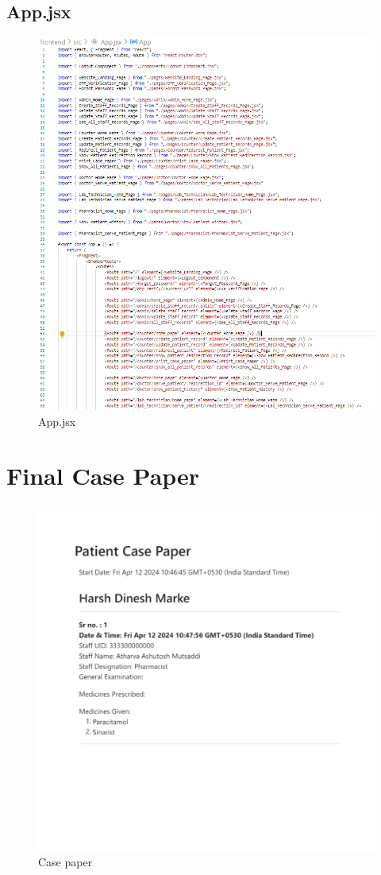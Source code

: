 \subsection{App.jsx}
\begin{figure}[h!]
    \centering
    \includegraphics[width=\textwidth]{app.png}
    \caption{App.jsx}
\end{figure}
\clearpage
\section{Final Case Paper}
\begin{figure}[h!]
    \centering
    \includegraphics[width=\textwidth]{casepaper.png}
    \caption{Case paper}
\end{figure} 
